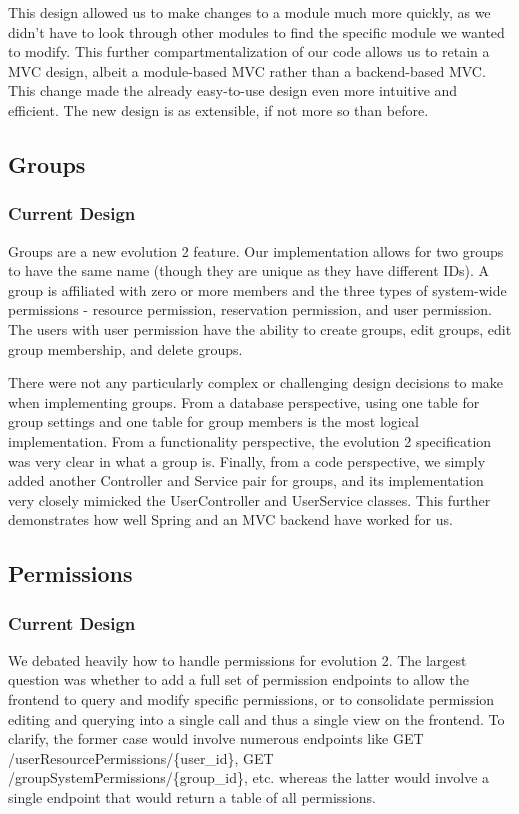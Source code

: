 \documentclass[12pt]{article}
\begin{document}
This design allowed us to make changes to a module much more quickly, as we didn't have to look through other modules to find the specific module we wanted to modify. This further compartmentalization of our code allows us to retain a MVC design, albeit a module-based MVC rather than a backend-based MVC. This change made the already easy-to-use design even more intuitive and efficient. The new design is as extensible, if not more so than before. 

\subsection{Groups}
\label{sec:GROUPS}
\subsubsection{Current Design}
Groups are a new evolution 2 feature. Our implementation allows for two groups to have the same name (though they are unique as they have different IDs). A group is affiliated with zero or more members and the three types of system-wide permissions - resource permission, reservation permission, and user permission. The users with user permission have the ability to create groups, edit groups, edit group membership, and delete groups. 

There were not any particularly complex or challenging design decisions to make when implementing groups. From a database perspective, using one table for group settings and one table for group members is the most logical implementation. From a functionality perspective, the evolution 2 specification was very clear in what a group is. Finally, from a code perspective, we simply added another Controller and Service pair for groups, and its implementation very closely mimicked the UserController and UserService classes. This further demonstrates how well Spring and an MVC backend have worked for us. 


\subsection{Permissions}
\subsubsection{Current Design}
We debated heavily how to handle permissions for evolution 2. The largest question was whether to add a full set of permission endpoints to allow the frontend to query and modify specific permissions, or to consolidate permission editing and querying into a single call and thus a single view on the frontend. To clarify, the former case would involve numerous endpoints like GET /userResourcePermissions/\{user\_id\}, GET /groupSystemPermissions/\{group\_id\}, etc. whereas the latter would involve a single endpoint that would return a table of all permissions. 
\end{document}
